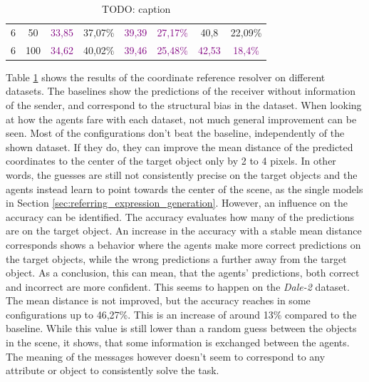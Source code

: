 \begin{table}[ht]
\begin{tabular}{cc|cc|cc|cc}
        {6}                           & {50}    & \textcolor{purple}{33,85}           & {37,07\%}                           & \textcolor{purple}{39,39}                & \textcolor{purple}{27,17\%} & {40,8}                    & {22,09\%}                   \\
        {6}                           & {100}   & \textcolor{purple}{34,62}           & {40,02\%}                           & \textcolor{purple}{39,46}                & \textcolor{purple}{25,48\%} & \textcolor{purple}{42,53} & \textcolor{purple}{18,4\%}  \\
        \bottomrule
    \end{tabular}
    \caption{TODO: caption}
    \label{tab:results:coordinate-reference-resolver-game}
\end{table}

Table \ref{tab:results:coordinate-reference-resolver-game} shows the results of the coordinate reference resolver on different datasets.
The baselines show the predictions of the receiver without information of the sender, and correspond to the structural bias in the dataset.
When looking at how the agents fare with each dataset, not much general improvement can be seen.
Most of the configurations don't beat the baseline, independently of the shown dataset.
If they do, they can improve the mean distance of the predicted coordinates to the center of the target object only by 2 to 4 pixels.
In other words, the guesses are still not consistently precise on the target objects and the agents instead learn to point towards the center of the scene, as the single models in Section \ref{sec:referring_expression_generation}.
However, an influence on the accuracy can be identified.
The accuracy evaluates how many of the predictions are on the target object.
An increase in the accuracy with a stable mean distance corresponds shows a behavior where the agents make more correct predictions on the target objects, while the wrong predictions a further away from the target object.
As a conclusion, this can mean, that the agents' predictions, both correct and incorrect are more confident.
This seems to happen on the \emph{Dale-2} dataset.
The mean distance is not improved, but the accuracy reaches in some configurations up to 46,27\%.
This is an increase of around 13\% compared to the baseline.
While this value is still lower than a random guess between the objects in the scene, it shows, that some information is exchanged between the agents.
The meaning of the messages however doesn't seem to correspond to any attribute or object to consistently solve the task.

